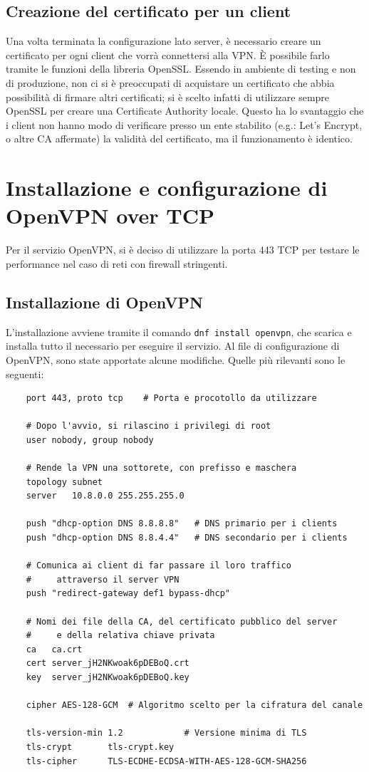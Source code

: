 \subsection{Creazione del certificato per un client}
Una volta terminata la configurazione lato server, è necessario creare un certificato per ogni client che vorrà connettersi alla VPN. È possibile farlo tramite le funzioni della libreria OpenSSL. Essendo in ambiente di testing e non di produzione, non ci si è preoccupati di acquistare un certificato che abbia possibilità di firmare altri certificati; si è scelto infatti di utilizzare sempre OpenSSL per creare una Certificate Authority locale. Questo ha lo svantaggio che i client non hanno modo di verificare presso un ente stabilito (e.g.: Let's Encrypt, o altre CA affermate) la validità del certificato, ma il funzionamento è identico.

\section{Installazione e configurazione di OpenVPN over TCP}
Per il servizio OpenVPN, si è deciso di utilizzare la porta 443 TCP per testare le performance nel caso di reti con firewall stringenti.

\subsection{Installazione di OpenVPN}
L'installazione avviene tramite il comando \texttt{dnf install openvpn}, che scarica e installa tutto il necessario per eseguire il servizio.
Al file di configurazione di OpenVPN, sono state apportate alcune modifiche. Quelle più rilevanti sono le seguenti:

\begin{verbatim}
    port 443, proto tcp    # Porta e procotollo da utilizzare
    
    # Dopo l'avvio, si rilascino i privilegi di root
    user nobody, group nobody   

    # Rende la VPN una sottorete, con prefisso e maschera
    topology subnet         
    server   10.8.0.0 255.255.255.0

    push "dhcp-option DNS 8.8.8.8"   # DNS primario per i clients
    push "dhcp-option DNS 8.8.4.4"   # DNS secondario per i clients

    # Comunica ai client di far passare il loro traffico 
    #     attraverso il server VPN
    push "redirect-gateway def1 bypass-dhcp"   

    # Nomi dei file della CA, del certificato pubblico del server 
    #     e della relativa chiave privata
    ca   ca.crt
    cert server_jH2NKwoak6pDEBoQ.crt
    key  server_jH2NKwoak6pDEBoQ.key
    
    cipher AES-128-GCM  # Algoritmo scelto per la cifratura del canale

    tls-version-min 1.2            # Versione minima di TLS
    tls-crypt       tls-crypt.key
    tls-cipher      TLS-ECDHE-ECDSA-WITH-AES-128-GCM-SHA256  
\end{verbatim}


